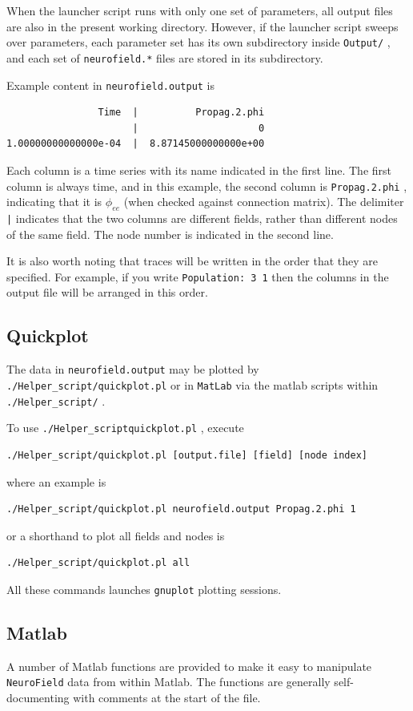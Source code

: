 \documentclass[12pt,a4paper]{article}
\newcommand{\type}[1]{ {\small\small\tt #1} }
\newcommand{\NF}[0]{ \type{NeuroField}}
\begin{document}
When the launcher script runs with only one set of parameters, all output files are also in the present working directory. However, if the launcher script sweeps over parameters, each parameter set has its own subdirectory inside \type{Output/}, and each set of \type{neurofield.*} files are stored in its subdirectory.

Example content in \type{neurofield.output} is
\begin{lstlisting}
                Time  |          Propag.2.phi
                      |                     0
1.00000000000000e-04  |  8.87145000000000e+00
\end{lstlisting}

Each column is a time series with its name indicated in the first line. The first column is always time, and in this example, the second column is \type{Propag.2.phi}, indicating that it is $\phi_{ee}$ (when checked against connection matrix). The delimiter \type{|} indicates that the two columns are different fields, rather than different nodes of the same field. The node number is indicated in the second line.

It is also worth noting that traces will be written in the order that they are specified. For example, if you write \type{Population: 3 1} then the columns in the output file will be arranged in this order. 

\subsection{Quickplot}

The data in \type{neurofield.output} may be plotted by \type{./Helper\_script/quickplot.pl} or in \type{MatLab} via the matlab scripts within \type{./Helper\_script/}.

To use \type{./Helper\_script\/quickplot.pl}, execute
\begin{lstlisting}
./Helper_script/quickplot.pl [output.file] [field] [node index]
\end{lstlisting}
where an example is
\begin{lstlisting}
./Helper_script/quickplot.pl neurofield.output Propag.2.phi 1
\end{lstlisting}
or a shorthand to plot all fields and nodes is
\begin{lstlisting}
./Helper_script/quickplot.pl all
\end{lstlisting}
All these commands launches \type{gnuplot} plotting sessions.

\subsection{Matlab}
A number of Matlab functions are provided to make it easy to manipulate \NF data from within Matlab. The functions are generally self-documenting with comments at the start of the file.
\end{document}
